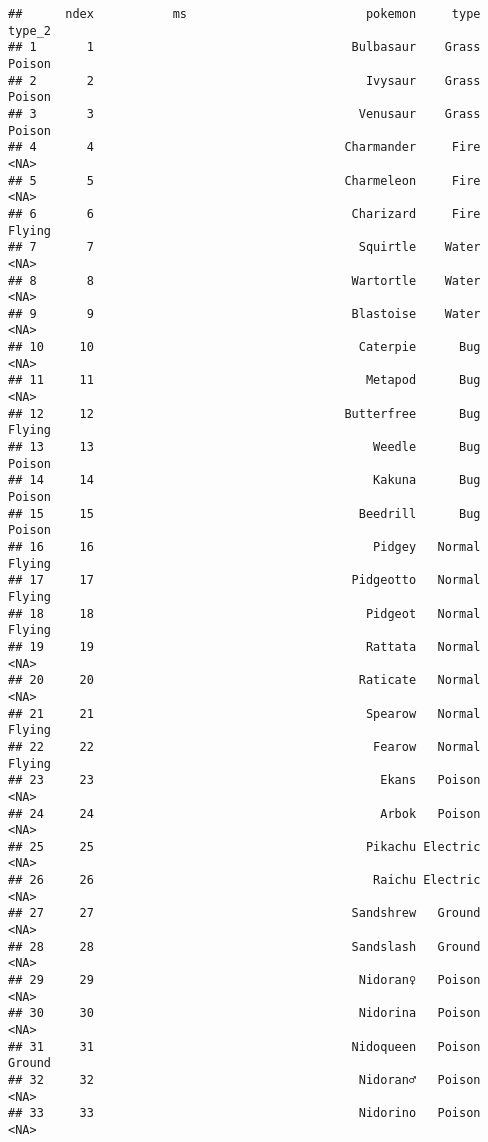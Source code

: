 \documentclass[
]{article}
\begin{document}
\begin{verbatim}
##      ndex           ms                         pokemon     type   type_2
## 1       1                                    Bulbasaur    Grass   Poison
## 2       2                                      Ivysaur    Grass   Poison
## 3       3                                     Venusaur    Grass   Poison
## 4       4                                   Charmander     Fire     <NA>
## 5       5                                   Charmeleon     Fire     <NA>
## 6       6                                    Charizard     Fire   Flying
## 7       7                                     Squirtle    Water     <NA>
## 8       8                                    Wartortle    Water     <NA>
## 9       9                                    Blastoise    Water     <NA>
## 10     10                                     Caterpie      Bug     <NA>
## 11     11                                      Metapod      Bug     <NA>
## 12     12                                   Butterfree      Bug   Flying
## 13     13                                       Weedle      Bug   Poison
## 14     14                                       Kakuna      Bug   Poison
## 15     15                                     Beedrill      Bug   Poison
## 16     16                                       Pidgey   Normal   Flying
## 17     17                                    Pidgeotto   Normal   Flying
## 18     18                                      Pidgeot   Normal   Flying
## 19     19                                      Rattata   Normal     <NA>
## 20     20                                     Raticate   Normal     <NA>
## 21     21                                      Spearow   Normal   Flying
## 22     22                                       Fearow   Normal   Flying
## 23     23                                        Ekans   Poison     <NA>
## 24     24                                        Arbok   Poison     <NA>
## 25     25                                      Pikachu Electric     <NA>
## 26     26                                       Raichu Electric     <NA>
## 27     27                                    Sandshrew   Ground     <NA>
## 28     28                                    Sandslash   Ground     <NA>
## 29     29                                     Nidoran♀   Poison     <NA>
## 30     30                                     Nidorina   Poison     <NA>
## 31     31                                    Nidoqueen   Poison   Ground
## 32     32                                     Nidoran♂   Poison     <NA>
## 33     33                                     Nidorino   Poison     <NA>

\end{verbatim}
\end{document}
